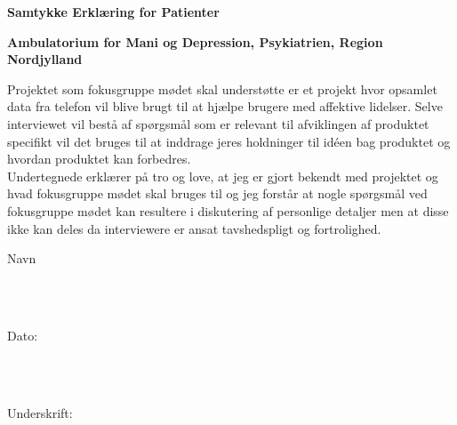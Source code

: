 \vspace{5cm}

{\centering \Large \textbf{Samtykke Erklæring for Patienter} \\ \vspace{2cm}}

{\centering \large \textbf{Ambulatorium for Mani og Depression, Psykiatrien, Region Nordjylland} \\ \vspace{2cm}}


\noindent
Projektet som fokusgruppe mødet skal understøtte er et projekt hvor opsamlet data fra telefon vil blive brugt til at hjælpe brugere med affektive lidelser. Selve interviewet vil bestå af spørgsmål som er relevant til afviklingen af produktet specifikt vil det bruges til at inddrage jeres holdninger til idéen bag produktet og hvordan produktet kan forbedres. \\ 

\noindent
Undertegnede erklærer på tro og love, at jeg er gjort bekendt med projektet og hvad fokusgruppe mødet skal bruges til og jeg forstår at nogle spørgsmål ved fokusgruppe mødet kan resultere i diskutering af personlige detaljer men at disse ikke kan deles da interviewere er ansat tavshedspligt og fortrolighed.

\vspace{1cm}
\noindent
\vspace{5mm}
\parbox[h]{2cm}{Navn}\hspace{0.5cm} \makebox[7cm]{\hrulefill} \\ \\
\vspace{5mm}
\parbox[h]{2cm}{Dato:}\hspace{0.5cm} \makebox[7cm]{\hrulefill} \\ \\
\vspace{5mm}
\parbox[h]{2cm}{Underskrift: }\hspace{0.5cm} \makebox[7cm]{\hrulefill} \\ \\
\vspace{5mm}